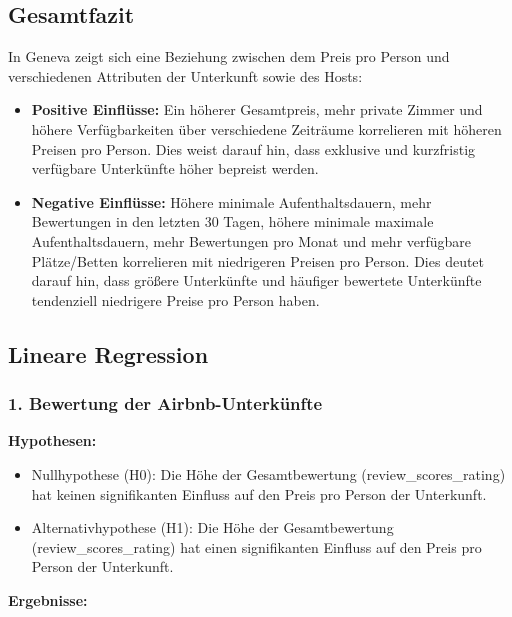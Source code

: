 \documentclass[
  journal,
]{IEEEtran}%
\providecommand{\tightlist}{%
  \setlength{\itemsep}{0pt}\setlength{\parskip}{0pt}}\usepackage{longtable,booktabs,array}
\begin{document}
\subsection{Gesamtfazit}\label{gesamtfazit-2}

In Geneva zeigt sich eine Beziehung zwischen dem Preis pro Person und
verschiedenen Attributen der Unterkunft sowie des Hosts:

\begin{itemize}
\item
  \textbf{Positive Einflüsse:} Ein höherer Gesamtpreis, mehr private
  Zimmer und höhere Verfügbarkeiten über verschiedene Zeiträume
  korrelieren mit höheren Preisen pro Person. Dies weist darauf hin,
  dass exklusive und kurzfristig verfügbare Unterkünfte höher bepreist
  werden.
\item
  \textbf{Negative Einflüsse:} Höhere minimale Aufenthaltsdauern, mehr
  Bewertungen in den letzten 30 Tagen, höhere minimale maximale
  Aufenthaltsdauern, mehr Bewertungen pro Monat und mehr verfügbare
  Plätze/Betten korrelieren mit niedrigeren Preisen pro Person. Dies
  deutet darauf hin, dass größere Unterkünfte und häufiger bewertete
  Unterkünfte tendenziell niedrigere Preise pro Person haben.
\end{itemize}

\subsection{\texorpdfstring{\textbf{Lineare
Regression}}{Lineare Regression}}\label{lineare-regression-1}

\subsubsection{1. Bewertung der
Airbnb-Unterkünfte}\label{bewertung-der-airbnb-unterkuxfcnfte}

\textbf{Hypothesen:}

\begin{itemize}
\tightlist
\item
  Nullhypothese (H0): Die Höhe der Gesamtbewertung
  (review\_scores\_rating) hat keinen signifikanten Einfluss auf den
  Preis pro Person der Unterkunft.
\item
  Alternativhypothese (H1): Die Höhe der Gesamtbewertung
  (review\_scores\_rating) hat einen signifikanten Einfluss auf den
  Preis pro Person der Unterkunft.
\end{itemize}

\textbf{Ergebnisse:}
\end{document}
